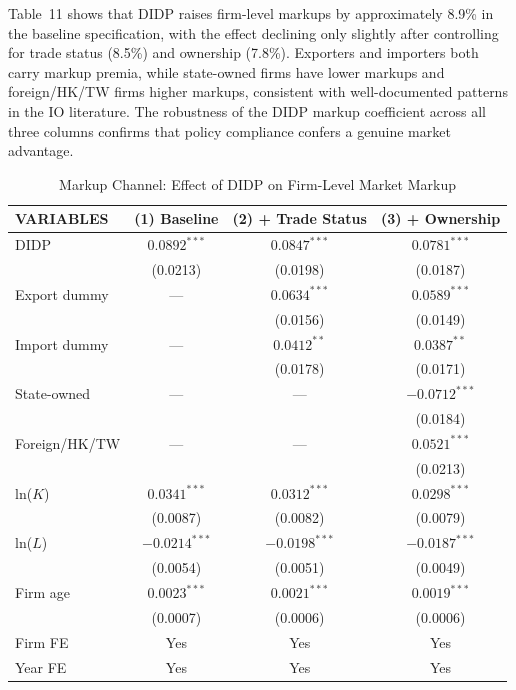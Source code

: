 \documentclass[11pt,a4paper]{article}
\begin{document}
Table~11 shows that DIDP raises firm-level markups by approximately 8.9\% in the baseline specification, with the effect declining only slightly after controlling for trade status (8.5\%) and ownership (7.8\%). Exporters and importers both carry markup premia, while state-owned firms have lower markups and foreign/HK/TW firms higher markups, consistent with well-documented patterns in the IO literature. The robustness of the DIDP markup coefficient across all three columns confirms that policy compliance confers a genuine market advantage.

\begin{table}[htbp]
\centering
\caption{Markup Channel: Effect of DIDP on Firm-Level Market Markup}
\label{tab:markup}
\begin{tabular}{lccc}
\toprule
VARIABLES & (1) Baseline & (2) + Trade Status & (3) + Ownership \\
\midrule
DIDP            & $0.0892^{***}$ & $0.0847^{***}$ & $0.0781^{***}$ \\
                & (0.0213) & (0.0198) & (0.0187) \\
Export dummy    & ---      & $0.0634^{***}$ & $0.0589^{***}$ \\
                &          & (0.0156) & (0.0149) \\
Import dummy    & ---      & $0.0412^{**}$ & $0.0387^{**}$ \\
                &          & (0.0178) & (0.0171) \\
State-owned     & ---      & ---      & $-0.0712^{***}$ \\
                &          &          & (0.0184) \\
Foreign/HK/TW   & ---      & ---      & $0.0521^{***}$ \\
                &          &          & (0.0213) \\
ln($K$)         & $0.0341^{***}$ & $0.0312^{***}$ & $0.0298^{***}$ \\
                & (0.0087) & (0.0082) & (0.0079) \\
ln($L$)         & $-0.0214^{***}$ & $-0.0198^{***}$ & $-0.0187^{***}$ \\
                & (0.0054) & (0.0051) & (0.0049) \\
Firm age        & $0.0023^{***}$ & $0.0021^{***}$ & $0.0019^{***}$ \\
                & (0.0007) & (0.0006) & (0.0006) \\
Firm FE         & Yes & Yes & Yes \\
Year FE         & Yes & Yes & Yes \\

\end{tabular}
\end{table}
\end{document}
